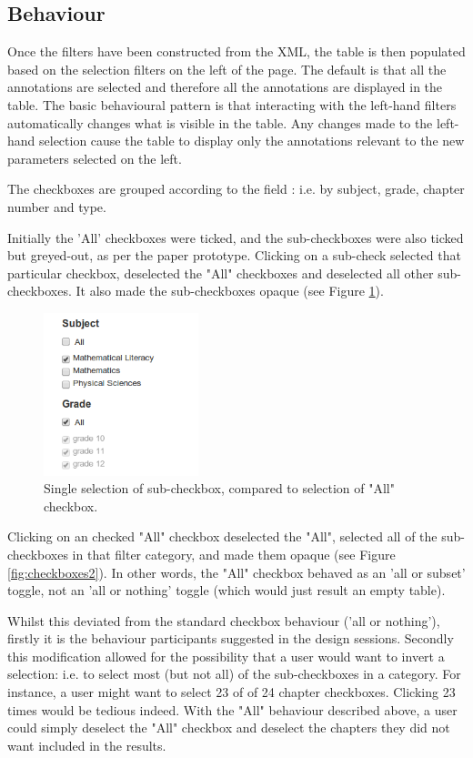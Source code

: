 \subsection{Behaviour}
Once the filters have been constructed from the XML, the table is then populated based on  the selection filters on the left of the page. The default is that all the annotations are selected and therefore all the annotations are displayed in the table. The basic behavioural pattern is that interacting with the left-hand filters automatically changes what is visible in the table. Any changes made to the left-hand selection cause the table to display only the annotations relevant to the new parameters selected on the left. 

The checkboxes are grouped according to the field \citep[p. 439]{Galitz}: i.e. by subject, grade, chapter number and type. 

Initially the 'All' checkboxes were ticked, and the sub-checkboxes were also ticked but greyed-out, as per the paper prototype. Clicking on a sub-check selected that particular checkbox, deselected the "All" checkboxes and deselected all other sub-checkboxes. It also made the sub-checkboxes opaque (see Figure \ref{fig:checkboxes1}). 

\begin{figure}[h!]
    \centering
    \includegraphics[width=0.4\textwidth]{Figures/V1/checkboxes.png}
 \caption{Single selection of sub-checkbox, compared to selection of "All" checkbox.}
 \label{fig:checkboxes1}
\end{figure}

Clicking on an checked "All" checkbox deselected the "All", selected all of the sub-checkboxes in that filter category, and made them opaque (see Figure \ref{fig:checkboxes2}). In other words, the "All" checkbox behaved as an 'all or subset' toggle, not an 'all or nothing' toggle (which would just result an empty table). 

Whilst this deviated from the standard checkbox behaviour ('all or nothing'), firstly it is the behaviour participants suggested in the design sessions. Secondly \citep[p. 435]{Galitz} this modification allowed for the possibility that a user would want to invert a selection: i.e. to select most (but not all) of the sub-checkboxes in a category. For instance, a user might want to select 23 of of 24 chapter checkboxes. Clicking 23 times would be tedious indeed. With the "All" behaviour described above, a user could simply deselect the "All" checkbox and deselect the chapters they did not want included in the results.

